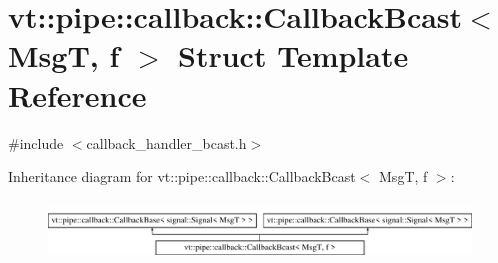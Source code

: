 \hypertarget{structvt_1_1pipe_1_1callback_1_1_callback_bcast}{}\section{vt\+:\+:pipe\+:\+:callback\+:\+:Callback\+Bcast$<$ MsgT, f $>$ Struct Template Reference}
\label{structvt_1_1pipe_1_1callback_1_1_callback_bcast}


{\ttfamily \#include $<$callback\+\_\+handler\+\_\+bcast.\+h$>$}

Inheritance diagram for vt\+:\+:pipe\+:\+:callback\+:\+:Callback\+Bcast$<$ MsgT, f $>$\+:\begin{figure}[H]
\begin{center}
\leavevmode
\includegraphics[height=1.604584cm]{structvt_1_1pipe_1_1callback_1_1_callback_bcast}
\end{center}
\end{figure}
